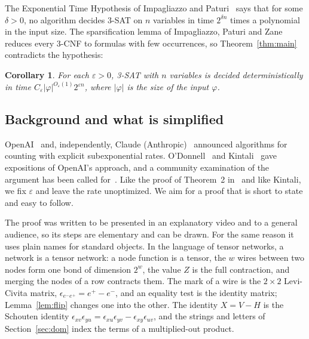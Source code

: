 \documentclass[11pt]{article}
\newtheorem{corollary}[theorem]{Corollary}
\begin{document}
The Exponential Time Hypothesis of Impagliazzo and Paturi~\cite{IP01} says that for some $\delta>0$, no algorithm decides 3-SAT on $n$ variables in time $2^{\delta n}$ times a polynomial in the input size. The sparsification lemma of Impagliazzo, Paturi and Zane~\cite{IPZ01} reduces every 3-CNF to formulas with few occurrences, so Theorem~\ref{thm:main} contradicts the hypothesis:

\begin{corollary}\label{cor:eth}
For each $\varepsilon>0$, 3-SAT with $n$ variables is decided deterministically in time $C_\varepsilon|\varphi|^{O_\varepsilon(1)}2^{\varepsilon n}$, where $|\varphi|$ is the size of the input $\varphi$.
\end{corollary}

\subsection*{Background and what is simplified}

OpenAI~\cite{OAI26} and, independently, Claude (Anthropic)~\cite{Cla26} announced algorithms for counting with explicit subexponential rates. O'Donnell~\cite{OD26} and Kintali~\cite{Kin26} gave expositions of OpenAI's approach, and a community examination of the argument has been called for~\cite{ETHblog}. Like the proof of Theorem~2 in~\cite{Cla26} and like Kintali, we fix $\varepsilon$ and leave the rate unoptimized. We aim for a proof that is short to state and easy to follow.

The proof was written to be presented in an explanatory video and to a general audience, so its steps are elementary and can be drawn. For the same reason it uses plain names for standard objects. In the language of tensor networks, a network is a tensor network: a node function is a tensor, the $w$ wires between two nodes form one bond of dimension $2^w$, the value $Z$ is the full contraction, and merging the nodes of a row contracts them. The mark of a wire is the $2\times2$ Levi-Civita matrix, $\epsilon_{e^-e^+}=e^+-e^-$, and an equality test is the identity matrix; Lemma~\ref{lem:flip} changes one into the other. The identity $X=V-H$ is the Schouten identity $\epsilon_{xv}\epsilon_{yu}=\epsilon_{xu}\epsilon_{yv}-\epsilon_{xy}\epsilon_{uv}$, and the strings and letters of Section~\ref{sec:dom} index the terms of a multiplied-out product.
\end{document}
